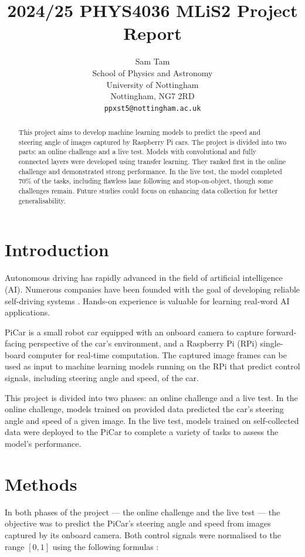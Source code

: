 \documentclass{article}
\title{2024/25 PHYS4036 MLiS2 Project Report}
\author{%
  Sam Tam \\
  School of Physics and Astronomy\\
  University of Nottingham\\
  Nottingham, NG7 2RD \\
  \texttt{ppxst5@nottingham.ac.uk}
}
\begin{document}
\maketitle


\begin{abstract}
  This project aims to develop machine learning models to predict the speed and steering angle of images captured by Raspberry Pi cars. The project is divided into two parts: an online challenge and a live test. Models with convolutional and fully connected layers were developed using transfer learning. They ranked first in the online challenge and demonstrated strong performance. In the live test, the model completed 70\% of the tasks, including flawless lane following and stop-on-object, though some challenges remain. Future studies could focus on enhancing data collection for better generalisability.
\end{abstract}

\section{Introduction}
Autonomous driving has rapidly advanced in the field of artificial intelligence (AI). Numerous companies have been founded with the goal of developing reliable self-driving systems \citep{Law_2023}. Hands-on experience is valuable for learning real-word AI applications.

PiCar \citep{SunFounder} is a small robot car equipped with an onboard camera to capture forward-facing perspective of the car's environment, and a Raspberry Pi (RPi) single-board computer \citep{RaspberryPi} for real-time computation. The captured image frames can be used as input to machine learning models running on the RPi that predict control signals, including steering angle and speed, of the car.

This project is divided into two phases: an online challenge and a live test. In the online challenge, models trained on provided data predicted the car's steering angle and speed of a given image. In the live test, models trained on self-collected data were deployed to the PiCar to complete a variety of tasks to assess the model's performance.


\section{Methods}
In both phases of the project — the online challenge and the live test — the objective was to predict the PiCar's steering angle and speed from images captured by its onboard camera. Both control signals were normalised to the range \([0, 1]\) using the following formulas \citep{Kaggle}:
\end{document}

